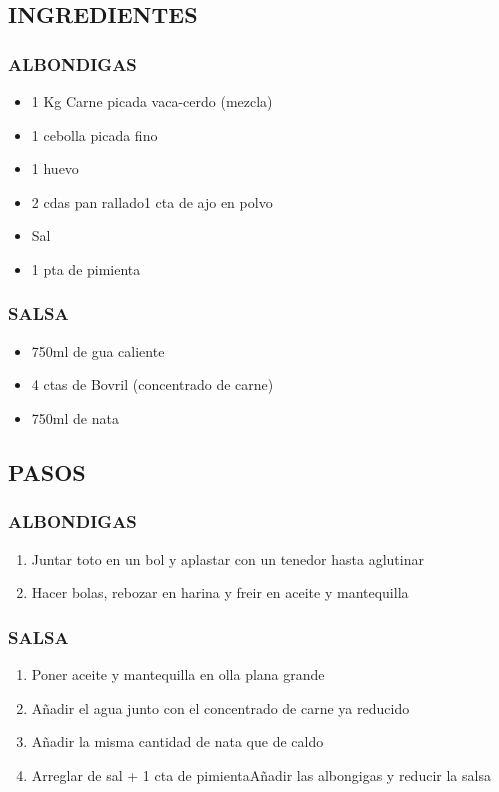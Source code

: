 
\subsection*{INGREDIENTES}
\subsubsection*{ALBONDIGAS}
\begin{itemize}
    \item 1 Kg Carne picada vaca-cerdo (mezcla)
    \item 1 cebolla picada fino
    \item 1 huevo
    \item 2 cdas pan rallado1 cta de ajo en polvo
    \item Sal
    \item 1 pta de pimienta
\end{itemize}
\subsubsection*{SALSA}
\begin{itemize}
    \item 750ml de gua caliente
    \item 4 ctas de Bovril (concentrado de carne)
    \item 750ml de nata
\end{itemize}

\subsection*{PASOS}
\subsubsection*{ALBONDIGAS}
\begin{enumerate}
    \item Juntar toto en un bol y aplastar con un tenedor hasta aglutinar
    \item Hacer bolas, rebozar en harina y freir en aceite y mantequilla
\end{enumerate}
\subsubsection*{SALSA}
\begin{enumerate}
    \item Poner aceite y mantequilla en olla plana grande
    \item Añadir el agua junto con el concentrado de carne ya reducido
    \item Añadir la misma cantidad de nata que de caldo
    \item Arreglar de sal + 1 cta de pimientaAñadir las albongigas y reducir la salsa
\end{enumerate}
